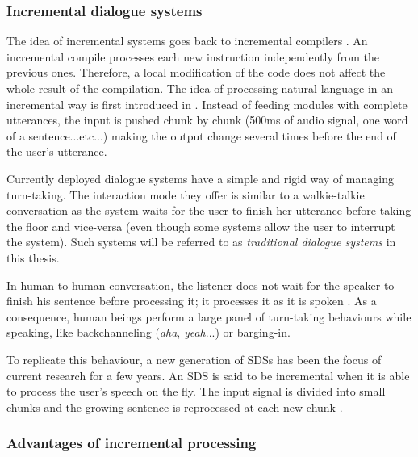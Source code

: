 
        \subsubsection{Incremental dialogue systems}
    
        	The idea of incremental systems goes back to incremental compilers \cite{Lock1965}. An incremental compile processes each new instruction independently from the previous ones. Therefore, a local modification of the code does not affect the whole result of the compilation. The idea of processing natural language in an incremental way is first introduced in \cite{Wiren1992}. Instead of feeding modules with complete utterances, the input is pushed chunk by chunk (500ms of audio signal, one word of a sentence...etc...) making the output change several times before the end of the user's utterance.

	    	Currently deployed dialogue systems have a simple and rigid way of managing turn-taking. The interaction mode they offer is similar to a walkie-talkie conversation as the system waits for the user to finish her utterance before taking the floor and vice-versa (even though some systems allow the user to interrupt the system). Such systems will be referred to as \textit{traditional dialogue systems} in this thesis.
        
    	    In human to human conversation, the listener does not wait for the speaker to finish his sentence before processing it; it processes it as it is spoken \cite{Tanenhaus1995}. As a consequence, human beings perform a large panel of turn-taking behaviours while speaking, like backchanneling (\textit{aha}, \textit{yeah}...) or barging-in.
            
            To replicate this behaviour, a new generation of SDSs has been the focus of current research for a few years. An SDS is said to be incremental when it is able to process the user's speech on the fly. The input signal is divided into small chunks and the growing sentence is reprocessed at each new chunk \cite{Schlangen2011}.

            \subsubsection{Advantages of incremental processing}

